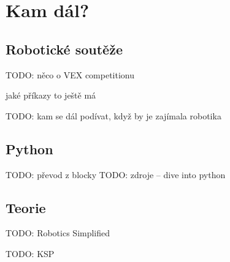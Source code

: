 \documentclass[../main.tex]{subfiles}
\begin{document}
	\section{Kam dál?}

	\subsection{Robotické soutěže}
	TODO: něco o VEX competitionu

	jaké příkazy to ještě má

	TODO: kam se dál podívat, když by je zajímala robotika

	\subsection{Python}
	TODO: převod z blocky
	TODO: zdroje -- dive into python

	\subsection{Teorie}
	TODO: Robotics Simplified

	TODO: KSP
\end{document}
